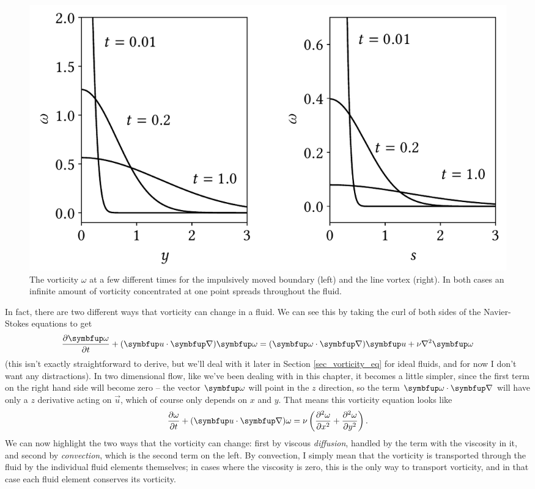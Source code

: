 \begin{figure}
\centering
\includegraphics[width=0.8\linewidth]{Figures/Chapter2/fig_vorticity_transport}
\caption{The vorticity $\omega$ at a few different times for the impulsively moved boundary (left) and the line vortex (right).  In both cases an infinite amount of vorticity concentrated at one point spreads throughout the fluid.}
\label{fig_vorticity_transport}
\end{figure}

In fact, there are two different ways that vorticity can change in a fluid.  We can see this by taking the curl of both sides of the Navier-Stokes equations to get
\begin{equation}
\dfdx{\vort}{t} + (\vec{u} \cdot \grad) \vort = (\vort \cdot \grad) \vec{u} + \nu \nabla^2 \vort
\end{equation}
(this isn't exactly straightforward to derive, but we'll deal with it later in Section \ref{sec_vorticity_eq} for ideal fluids, and for now I don't want any distractions).  In two dimensional flow, like we've been dealing with in this chapter, it becomes a little simpler, since the first term on the right hand side will become zero -- the vector $\vort$ will point in the $z$ direction, so the term $\vort \cdot \grad$ will have only a $z$ derivative acting on $\vec{u}$, which of course only depends on $x$ and $y$.  That means this vorticity equation looks like
\[
\dfdx{\omega}{t} + (\vec{u}  \cdot \grad) \omega = \nu \left( \ddfdx{\omega}{x} + \ddfdx{\omega}{y} \right).
\]
We can now highlight the two ways that the vorticity can change:  first by viscous \emph{diffusion}, handled by the term with the viscosity in it, and second by \emph{convection}, which is the second term on the left.  By convection, I simply mean that the vorticity is transported through the fluid by the individual fluid elements themselves; in cases where the viscosity is zero, this is the only way to transport vorticity, and in that case each fluid element conserves its vorticity.

